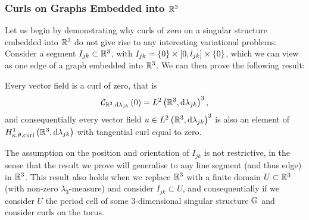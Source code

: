 \subsubsection{Curls on Graphs Embedded into $\mathbb{R}^3$} \label{sssec:3DGraphCurlsZero}
Let us begin by demonstrating why curls of zero on a singular structure embedded into $\mathbb{R}^3$ do not give rise to any interesting variational problems.
Consider a segment $I_{jk}\subset\mathbb{R}^3$, with $I_{jk} = \left\{ 0 \right\}\times\left[ 0,l_{jk} \right]\times\left\{ 0 \right\}$, which we can view as one edge of a graph embedded into $\mathbb{R}^3$.
We can then prove the following result:
\begin{prop} \label{prop:3DGraph-CurlsAreZero}
	Every vector field is a curl of zero, that is
	\begin{align*}
		\mathcal{C}_{ \mathbb{R}^3, \mathrm{d}\lambda_{jk}}\left( 0 \right) = L^{2}\left( \mathbb{R}^3,\mathrm{d} \lambda_{jk} \right)^3,
	\end{align*}
	and consequentially every vector field $u\in L^{2}\left( \mathbb{R}^3,\mathrm{d} \lambda_{jk} \right)^3$ is also an element of $H^1_{\kappa,\theta,\mathrm{curl}}\left( \mathbb{R}^3, \mathrm{d}\lambda_{jk} \right)$ with tangential curl equal to zero.
\end{prop}
The assumption on the position and orientation of $I_{jk}$ is not restrictive, in the sense that the result we prove will generalise to any line segment (and thus edge) in $\mathbb{R}^3$.
This result also holds when we replace $\mathbb{R}^3$ with a finite domain $U\subset\mathbb{R}^3$ (with non-zero $\lambda_3$-measure) and consider $I_{jk}\subset U$, and consequentially if we consider $U$ the period cell of some 3-dimensional singular structure $\mathbb{G}$ and consider curls on the torus.
